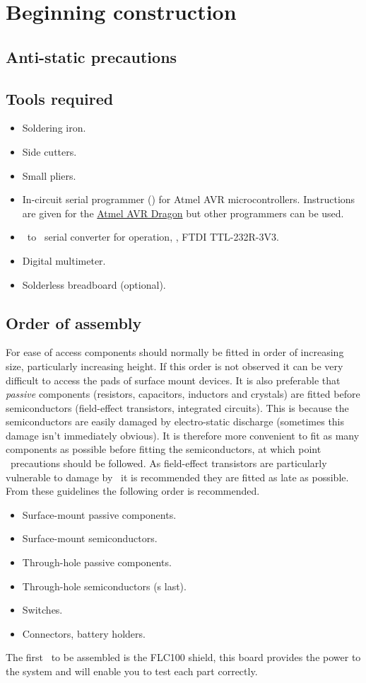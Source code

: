 \chapter{Beginning construction}

\section{Anti-static precautions}

\section{Tools required}

\begin{itemize}
\item Soldering iron.
\item Side cutters.
\item Small pliers.
\item In-circuit serial programmer (\isp) for Atmel AVR
  microcontrollers. Instructions are given for the
  \href{http://www.atmel.com/tools/AVRDRAGON.aspx}{Atmel AVR Dragon}
  but other programmers can be used.
\item \usb\ to \ttl\ serial converter for  operation, \eg, FTDI
  TTL-232R-3V3.
\item Digital multimeter.
\item Solderless breadboard (optional).
\end{itemize}

\section{Order of assembly}

For ease of access components should normally be fitted in order of
increasing size, particularly increasing height. If this order is not
observed it can be very difficult to access the pads of surface mount
devices. It is also preferable that \emph{passive} components
(resistors, capacitors, inductors and crystals) are fitted before
semiconductors (field-effect transistors, integrated circuits). This
is because the semiconductors are easily damaged by electro-static
discharge (sometimes this damage isn't immediately obvious). It is
therefore more convenient to fit as many components as possible before
fitting the semiconductors, at which point \esd\ precautions should be
followed. As field-effect transistors are particularly vulnerable to
damage by \esd\ it is recommended they are fitted as late as possible.
From these guidelines the following order is recommended.
\begin{itemize}
\item Surface-mount passive components.
\item Surface-mount semiconductors.
\item Through-hole passive components.
\item Through-hole semiconductors (\fet s last).
\item Switches.
\item Connectors, battery holders.
\end{itemize}

The first \pcb\ to be assembled is the FLC100 shield, this board
provides the power to the system and will enable you to test each part
correctly.
